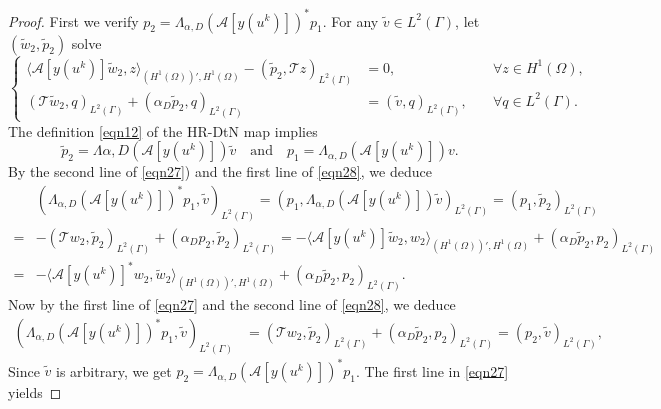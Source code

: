 \documentclass[onefignum,onetabnum]{siamart190516}
\numberwithin{equation}{section}
\begin{document}
\begin{proof}
First we verify $p_2 = \Lambda_{\alpha,D}(\mathcal{A}[y(u^{k})])^{*} p_1$.
For any $\tilde{v} \in L^{2}(\Gamma)$, let $(\tilde{w}_{2}, \tilde{p}_{2})$ solve 
\begin{equation}\label{eqn28}
\left\{
\begin{aligned}
\langle \mathcal{A}[y(u^{k})] \tilde{w}_{2}, z \rangle_{(H^{1}(\Omega))', H^{1}(\Omega)} - (\tilde{p}_{2}, \mathcal{T} z)_{L^{2}(\Gamma)} &= 0, \quad &\forall z \in H^{1}(\Omega), \\
(\mathcal{T} \tilde{w}_{2}, q)_{L^{2}(\Gamma)} + (\alpha_{D} \tilde{p}_{2}, q)_{L^{2}(\Gamma)} &= (\tilde{v}, q)_{L^{2}(\Gamma)}, \quad &\forall q \in L^{2}(\Gamma).
\end{aligned}
\right.
\end{equation}
The definition \eqref{eqn12} of the HR-DtN map implies 
\begin{equation*} 
\tilde{p}_{2} = \Lambda{\alpha,D}(\mathcal{A}[y(u^{k})]) \tilde{v}\quad \mbox{and}\quad p_{1} = \Lambda_{\alpha,D}(\mathcal{A}[y(u^{k})]) v.
\end{equation*}
By the second line of \eqref{eqn27}) and the first line of \eqref{eqn28}, we deduce
\begin{align*}
& (\Lambda_{\alpha,D}(\mathcal{A}[y(u^{k})])^{*}p_{1},  \tilde{v})_{L^{2}(\Gamma)}=(p_{1}, \Lambda_{\alpha,D}(\mathcal{A}[y(u^{k})]) \tilde{v})_{L^{2}(\Gamma)} = (p_{1}, \tilde{p}_{2})_{L^{2}(\Gamma)} \\
{=}& -(\mathcal{T} w_{2}, \tilde{p}_{2})_{L^{2}(\Gamma)} + (\alpha_{D} p_{2}, \tilde{p}_{2})_{L^{2}(\Gamma)} 
{=} -\langle \mathcal{A}[y(u^{k})] \tilde{w}_{2}, w_{2} \rangle_{(H^{1}(\Omega))', H^{1}(\Omega)} + (\alpha_{D} \tilde{p}_{2}, p_{2})_{L^{2}(\Gamma)} \\
=& -\langle \mathcal{A}[y(u^{k})]^{*} w_{2}, \tilde{w}_{2} \rangle_{(H^{1}(\Omega))', H^{1}(\Omega)} + (\alpha_{D} \tilde{p}_{2}, p_{2})_{L^{2}(\Gamma)}.
\end{align*}
Now by the first line of \eqref{eqn27} and the second line of \eqref{eqn28}, we deduce
\begin{align*}
(\Lambda_{\alpha,D}(\mathcal{A}[y(u^{k})])^{*}p_{1},  \tilde{v})_{L^{2}(\Gamma)}&{=} (\mathcal{T} w_{2}, \tilde{p}_{2})_{L^{2}(\Gamma)} + (\alpha_{D} \tilde{p}_{2}, p_{2})_{L^{2}(\Gamma)}
{=}(p_{2}, \tilde{v})_{L^{2}(\Gamma)},
\end{align*}
Since $\tilde{v}$ is arbitrary, we get $p_2 = \Lambda_{\alpha,D}(\mathcal{A}[y(u^{k})])^{*} p_1$. The first line in \eqref{eqn27} yields 

\end{proof}
\end{document}

